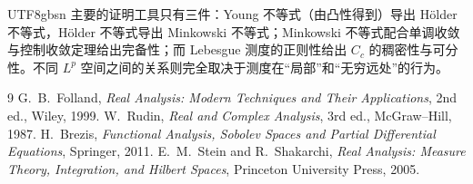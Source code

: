 \documentclass[11pt]{article}
\begin{document}
\begin{CJK*}{UTF8}{gbsn}
主要的证明工具只有三件：Young 不等式（由凸性得到）导出 Hölder 不等式，Hölder 不等式导出 Minkowski 不等式；Minkowski 不等式配合单调收敛与控制收敛定理给出完备性；而 Lebesgue 测度的正则性给出 $C_{c}$ 的稠密性与可分性。不同 $L^{p}$ 空间之间的关系则完全取决于测度在“局部”和“无穷远处”的行为。

\begin{thebibliography}{9}
 G.~B.~Folland, \emph{Real Analysis: Modern Techniques and Their Applications}, 2nd ed., Wiley, 1999.
 W.~Rudin, \emph{Real and Complex Analysis}, 3rd ed., McGraw--Hill, 1987.
 H.~Brezis, \emph{Functional Analysis, Sobolev Spaces and Partial Differential Equations}, Springer, 2011.
 E.~M.~Stein and R.~Shakarchi, \emph{Real Analysis: Measure Theory, Integration, and Hilbert Spaces}, Princeton University Press, 2005.
\end{thebibliography}

\end{CJK*}
\end{document}

